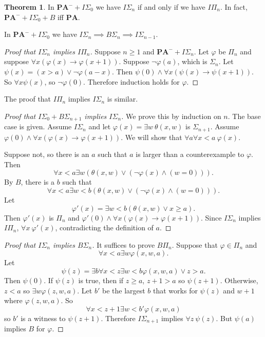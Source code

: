 \documentclass[12pt]{report}
\newcommand{\PA}{\mathbf{PA}}
\theoremstyle{definition}
\newtheorem{theorem}{Theorem}[chapter]
\begin{document}
\begin{theorem}
In $\PA^- + I\Sigma_0$ we have $I\Sigma_n$ if and only if we have $I\Pi_n$. In fact, $\PA^- + I\Sigma_0 + B$ iff $\PA$.

In $\PA^- + I\Sigma_0$ we have $I\Sigma_n \implies B\Sigma_n \implies I\Sigma_{n-1}$.
\end{theorem}
\begin{proof}[Proof that $I\Sigma_n$ implies $I\Pi_n$]
Suppose $n \geq 1$ and $\PA^- + I\Sigma_n$. Let $\varphi$ be $\Pi_n$ and suppose $\forall x(\varphi(x) \to \varphi(x+1))$.
Suppose $\neg \varphi(a)$, which is $\Sigma_n$. Let $\psi(x) = (x > a) \vee \neg \varphi(a-x)$.
Then $\psi(0) \wedge \forall x(\psi(x) \to \psi(x+1))$. So $\forall x \psi(x)$, so $\neg \varphi(0)$.
Therefore induction holds for $\varphi$.
\end{proof}
The proof that $I\Pi_n$ implies $I\Sigma_n$ is similar.
\begin{proof}[Proof that $I\Sigma_0 + B\Sigma_{n+1}$ implies $I\Sigma_n$]
We prove this by induction on $n$. The base case is given. Assume $I\Sigma_n$ and let $\varphi(x) = \exists w~\theta(x, w)$ is $\Sigma_{n+1}$.
Assume $\varphi(0) \wedge \forall x(\varphi(x) \to \varphi(x+1))$. We will show that $\forall a\forall x < a~\varphi(x)$.

Suppose not, so there is an $a$ such that $a$ is larger than a counterexample to $\varphi$. Then
$$\forall x <a\exists w(\theta(x, w) \vee (\neg\varphi(x) \wedge (w=0))).$$
By $B$, there is a $b$ such that
$$\forall x<a\exists w<b(\theta(x, w) \vee (\neg \varphi(x) \wedge (w=0))).$$
Let
$$\varphi'(x) = \exists w<b(\theta(x, w) \vee x \geq a).$$
Then $\varphi'(x)$ is $\Pi_n$ and $\varphi'(0) \wedge \forall x(\varphi(x)\to\varphi(x+1))$.
Since $I\Sigma_n$ implies $I\Pi_n$, $\forall x~\varphi'(x)$, contradicting the definition of $a$.
\end{proof}
\begin{proof}[Proof that $I\Sigma_n$ implies $B\Sigma_n$]
It suffices to prove $B\Pi_n$. Suppose that $\varphi \in \Pi_n$ and
$$\forall x <a\exists w\varphi(x, w, a).$$
Let
$$\psi(z) = \exists b\forall x <z\exists w<b\varphi(x,w,a) \vee z > a.$$
Then $\psi(0)$. If $\psi(z)$ is true, then if $z \geq a$, $z + 1 > a$ so $\psi(z+1)$.
Otherwise, $z < a$ so $\exists w \varphi(z,w,a)$. Let $b'$ be the largest $b$ that works for $\psi(z)$ and $w+1$ where $\varphi(z,w,a)$. So
$$\forall x<z+1\exists w<b'\varphi(x,w,a)$$
so $b'$ is a witness to $\psi(z+1)$. Therefore $I\Sigma_{n+1}$ implies $\forall z~\psi(z)$.
But $\psi(a)$ implies $B$ for $\varphi$.
\end{proof}
\end{document}

